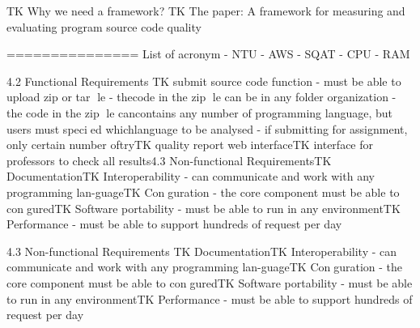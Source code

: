 TK Why we need a framework?
TK The paper: A framework for measuring and evaluating program source code quality


===============
List of acronym
- NTU
- AWS
- SQAT
- CPU
- RAM

4.2    Functional Requirements
TK  submit  source  code  function  -  must  be  able  to  upload  zip  or  tar  le  -  thecode in the zip le can be in any folder organization - the code in the zip le cancontains any number of programming language, but users must specied whichlanguage to be analysed - if submitting for assignment, only certain number oftryTK quality report web interfaceTK interface for professors to check all results4.3    Non-functional RequirementsTK DocumentationTK Interoperability - can communicate and work with any programming lan-guageTK Conguration - the core component must be able to conguredTK Software portability - must be able to run in any environmentTK Performance - must be able to support hundreds of request per day

4.3    Non-functional Requirements
TK DocumentationTK Interoperability - can communicate and work with any programming lan-guageTK Conguration - the core component must be able to conguredTK Software portability - must be able to run in any environmentTK Performance - must be able to support hundreds of request per day